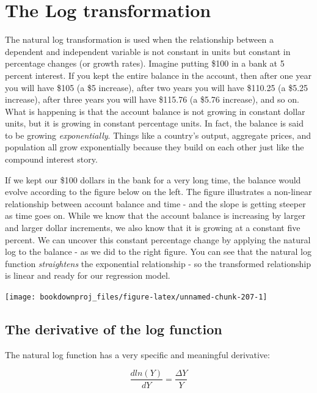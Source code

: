 \documentclass[
]{book}
\begin{document}
\section{The Log transformation}\label{the-log-transformation}

The natural log transformation is used when the relationship between a dependent and independent variable is not constant in units but constant in percentage changes (or growth rates). Imagine putting \$100 in a bank at 5 percent interest. If you kept the entire balance in the account, then after one year you will have \$105 (a \$5 increase), after two years you will have \$110.25 (a \$5.25 increase), after three years you will have \$115.76 (a \$5.76 increase), and so on. What is happening is that the account balance is not growing in constant dollar units, but it is growing in constant percentage units. In fact, the balance is said to be growing \emph{exponentially}. Things like a country's output, aggregate prices, and population all grow exponentially because they build on each other just like the compound interest story.

If we kept our \$100 dollars in the bank for a very long time, the balance would evolve according to the figure below on the left. The figure illustrates a non-linear relationship between account balance and time - and the slope is getting steeper as time goes on. While we know that the account balance is increasing by larger and larger dollar increments, we also know that it is growing at a constant five percent. We can uncover this constant percentage change by applying the natural log to the balance - as we did to the right figure. You can see that the natural log function \emph{straightens} the exponential relationship - so the transformed relationship is linear and ready for our regression model.

\begin{center}\texttt{[image: bookdownproj\_files/figure-latex/unnamed-chunk-207-1]} \end{center}

\subsection*{The derivative of the log function}\label{the-derivative-of-the-log-function}

The natural log function has a very specific and meaningful derivative:

\[\frac{dln(Y)}{dY} = \frac{\Delta Y}{Y}\]
\end{document}
